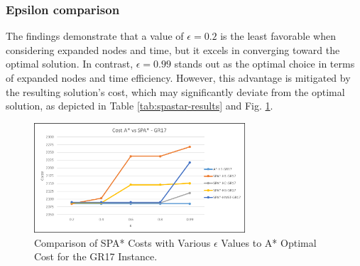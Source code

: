 \documentclass[runningheads]{llncs}
\begin{document}
\subsubsection{Epsilon comparison} 
The findings demonstrate that a value of $\epsilon = 0.2$ is the least favorable when considering expanded nodes and time, but it excels in converging toward the optimal solution. In contrast, $\epsilon = 0.99$ stands out as the optimal choice in terms of expanded nodes and time efficiency. However, this advantage is mitigated by the resulting solution's cost, which may significantly deviate from the optimal solution, as depicted in Table \ref{tab:spastar-results} and Fig. \ref{fig:alg-cost-comparison}.
\begin{figure}[H]
  \centering
  \includegraphics[width=0.7\textwidth]{Graph SPA.png} 
  \caption{Comparison of SPA* Costs with Various $\epsilon$ Values to A* Optimal Cost for the GR17 Instance.}
  \label{fig:alg-cost-comparison}
\end{figure}
\end{document}
